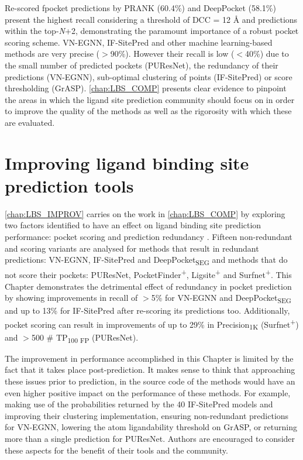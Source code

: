 Re-scored fpocket predictions by PRANK (60.4\%) and DeepPocket (58.1\%) present the highest recall considering a threshold of DCC = 12 \AA{} and predictions within the top-\textit{N}+2, demonstrating the paramount importance of a robust pocket scoring scheme. VN-EGNN, IF-SitePred and other machine learning-based methods are very precise ($>$90\%). However their recall is low ($<$40\%) due to the small number of predicted pockets (PUResNet), the redundancy of their predictions (VN-EGNN), sub-optimal clustering of points (IF-SitePred) or score thresholding (GrASP). \autoref{chap:LBS_COMP} presents clear evidence to pinpoint the areas in which the ligand site prediction community should focus on in order to improve the quality of the methods as well as the rigorosity with which these are evaluated.

\section{Improving ligand binding site prediction tools}

\autoref{chap:LBS_IMPROV} carries on the work in \autoref{chap:LBS_COMP} by exploring two factors identified to have an effect on ligand binding site prediction performance: pocket scoring and prediction redundancy \cite{UTGES_2024_LBSCOMP}. Fifteen non-redundant and scoring variants are analysed for methods that result in redundant predictions: VN-EGNN, IF-SitePred and DeepPocket\textsubscript{SEG} and methods that do not score their pockets: PUResNet, PocketFinder\textsuperscript{+}, Ligsite\textsuperscript{+} and Surfnet\textsuperscript{+}. This Chapter demonstrates the detrimental effect of redundancy in pocket prediction by showing improvements in recall of $>$5\% for VN-EGNN and DeepPocket\textsubscript{SEG} and up to 13\% for IF-SitePred after re-scoring its predictions too. Additionally, pocket scoring can result in improvements of up to 29\% in Precision\textsubscript{1K} (Surfnet\textsuperscript{+}) and $>$500 \# TP\textsubscript{100 FP} (PUResNet).

The improvement in performance accomplished in this Chapter is limited by the fact that it takes place post-prediction. It makes sense to think that approaching these issues prior to prediction, in the source code of the methods would have an even higher positive impact on the performance of these methods. For example, making use of the probabilities returned by the 40 IF-SitePred models and improving their clustering implementation, ensuring non-redundant predictions for VN-EGNN, lowering the atom ligandability threshold on GrASP, or returning more than a single prediction for PUResNet. Authors are encouraged to consider these aspects for the benefit of their tools and the community.

